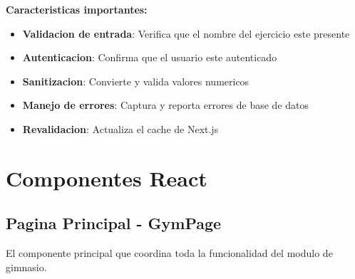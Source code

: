 \documentclass[12pt,a4paper]{article}
\begin{document}
\textbf{Caracteristicas importantes:}
\begin{itemize}
    \item \textbf{Validacion de entrada}: Verifica que el nombre del ejercicio este presente
    \item \textbf{Autenticacion}: Confirma que el usuario este autenticado
    \item \textbf{Sanitizacion}: Convierte y valida valores numericos
    \item \textbf{Manejo de errores}: Captura y reporta errores de base de datos
    \item \textbf{Revalidacion}: Actualiza el cache de Next.js
\end{itemize}

\section{Componentes React}

\subsection{Pagina Principal - GymPage}

El componente principal que coordina toda la funcionalidad del modulo de gimnasio.
\end{document}
